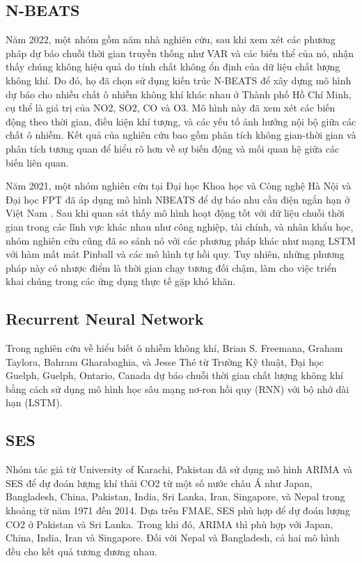 \documentclass[conference]{IEEEtran}
\begin{document}
\subsection{N-BEATS}
Năm 2022, một nhóm gồm năm nhà nghiên cứu, sau khi xem xét các phương pháp dự báo chuỗi thời gian truyền thống như VAR và các biến thể của nó, nhận thấy chúng không hiệu quả do tính chất không ổn định của dữ liệu chất lượng không khí. Do đó, họ đã chọn sử dụng kiến trúc N-BEATS \cite{b8} để xây dựng mô hình dự báo cho nhiều chất ô nhiễm không khí khác nhau ở Thành phố Hồ Chí Minh, cụ thể là giá trị của NO2, SO2, CO và O3. Mô hình này đã xem xét các biến động theo thời gian, điều kiện khí tượng, và các yếu tố ảnh hưởng nội bộ giữa các chất ô nhiễm. Kết quả của nghiên cứu bao gồm phân tích không gian-thời gian và phân tích tương quan để hiểu rõ hơn về sự biến động và mối quan hệ giữa các biến liên quan.

Năm 2021, một nhóm nghiên cứu tại Đại học Khoa học và Công nghệ Hà Nội và Đại học FPT đã áp dụng mô hình NBEATS để dự báo nhu cầu điện ngắn hạn ở Việt Nam \cite{b9}. Sau khi quan sát thấy mô hình hoạt động tốt với dữ liệu chuỗi thời gian trong các lĩnh vực khác nhau như công nghiệp, tài chính, và nhân khẩu học, nhóm nghiên cứu cũng đã so sánh nó với các phương pháp khác như mạng LSTM với hàm mất mát Pinball và các mô hình tự hồi quy. Tuy nhiên, những phương pháp này có nhược điểm là thời gian chạy tương đối chậm, làm cho việc triển khai chúng trong các ứng dụng thực tế gặp khó khăn.

\subsection{Recurrent Neural Network}
Trong nghiên cứu về hiểu biết ô nhiễm không khí, Brian S. Freemana, Graham Taylora, Bahram Gharabaghia, và Jesse Thé từ Trường Kỹ thuật, Đại học Guelph, Guelph, Ontario, Canada dự báo chuỗi thời gian chất lượng không khí bằng cách sử dụng mô hình học sâu mạng nơ-ron hồi quy (RNN) với bộ nhớ dài hạn (LSTM). \cite{b10}

\subsection{SES}
Nhóm tác giả từ University of Karachi, Pakistan đã sử dụng mô hình ARIMA và SES để dự đoán lượng khí thải CO2 từ một số nước châu Á như Japan, Bangladesh, China, Pakistan, India, Sri Lanka, Iran, Singapore, và Nepal trong khoảng từ năm 1971 đến 2014. Dựa trên FMAE, SES phù hợp để dự đoán lượng CO2 ở Pakistan và Sri Lanka. Trong khi đó, ARIMA thì phù hợp với Japan, China, India, Iran và Singapore. Đối với Nepal và Bangladesh, cả hai mô hình đều cho kết quả tương đương nhau. \cite{b11}
\end{document}

